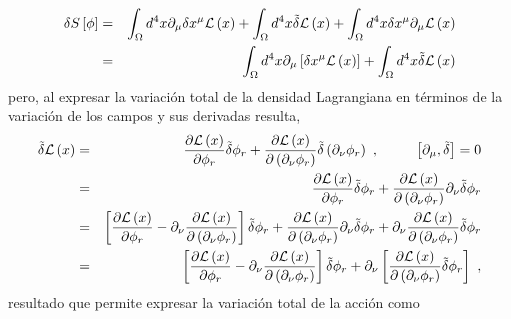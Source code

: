 \begin{eqnarray}
\delta S\left[ \phi \right]  &=&\int_{\Omega }d^{4}x\partial _{\mu }\delta
x^{\mu }\mathcal{L}\left( x\right) +\int_{\Omega }d^{4}x\tilde{\delta}\mathcal{%
L}\left( x\right) +\int_{\Omega }d^{4}x\delta x^{\mu }\partial _{\mu }%
\mathcal{L}\left( x\right)   \notag \\
&=&\int_{\Omega }d^{4}x\partial _{\mu }\left[ \delta x^{\mu }\mathcal{L}%
\left( x\right) \right] +\int_{\Omega }d^{4}x\tilde{\delta}\mathcal{L}\left(
x\right) 
\end{eqnarray}
pero, al expresar la variaci\'{o}n total de la densidad Lagrangiana en t\'{e}rminos de la variaci\'{o}n de los campos y sus derivadas resulta,
\begin{eqnarray*}
\tilde{\delta}\mathcal{L}\left( x\right)  &=&\frac{\partial \mathcal{L}\left(
x\right) }{\partial \phi _{r}}\tilde{\delta}\phi _{r}+\frac{\partial \mathcal{L%
}\left( x\right) }{\partial \left( \partial _{\nu }\phi _{r}\right) }\tilde{%
\delta}\left( \partial _{\nu }\phi _{r}\right) ~,~\ \ \ \ \ \ \ \left[
\partial _{\mu },\tilde{\delta}\right] =0 \\
&=&\frac{\partial \mathcal{L}\left( x\right) }{\partial \phi _{r}}\tilde{\delta%
}\phi _{r}+\frac{\partial \mathcal{L}\left( x\right) }{\partial \left(
\partial _{\nu }\phi _{r}\right) }\partial _{\nu }\tilde{\delta}\phi _{r} \\
&=&\left[ \frac{\partial \mathcal{L}\left( x\right) }{\partial \phi _{r}}%
-\partial _{\nu }\frac{\partial \mathcal{L}\left( x\right) }{\partial \left(
\partial _{\nu }\phi _{r}\right) }\right] \tilde{\delta}\phi _{r}+\frac{%
\partial \mathcal{L}\left( x\right) }{\partial \left( \partial _{\nu }\phi
_{r}\right) }\partial _{\nu }\tilde{\delta}\phi _{r}+\partial _{\nu }\frac{%
\partial \mathcal{L}\left( x\right) }{\partial \left( \partial _{\nu }\phi
_{r}\right) }\tilde{\delta}\phi _{r} \\
&=&\left[ \frac{\partial \mathcal{L}\left( x\right) }{\partial \phi _{r}}%
-\partial _{\nu }\frac{\partial \mathcal{L}\left( x\right) }{\partial \left(
\partial _{\nu }\phi _{r}\right) }\right] \tilde{\delta}\phi _{r}+\partial
_{\nu }\left[ \frac{\partial \mathcal{L}\left( x\right) }{\partial \left(
\partial _{\nu }\phi _{r}\right) }\tilde{\delta}\phi _{r}\right] ~,
\end{eqnarray*}
\noindent
resultado que permite expresar la variaci\'{o}n total de la acci\'{o}n como
